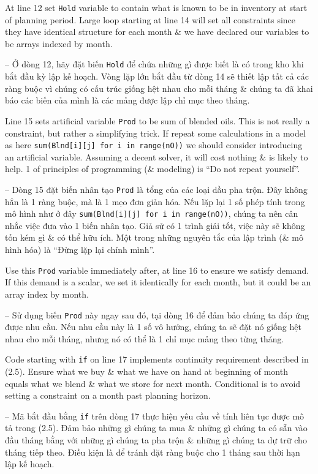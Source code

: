 \documentclass{article}
\begin{document}
\begin{itemize}
\begin{itemize}
\begin{itemize}
\begin{itemize}
                At line 12 set {\tt Hold} variable to contain what is known to be in inventory at start of planning period. Large loop starting at line 14 will set all constraints since they have identical structure for each month \& we have declared our variables to be arrays indexed by month.

                -- Ở dòng 12, hãy đặt biến {\tt Hold} để chứa những gì được biết là có trong kho khi bắt đầu kỳ lập kế hoạch. Vòng lặp lớn bắt đầu từ dòng 14 sẽ thiết lập tất cả các ràng buộc vì chúng có cấu trúc giống hệt nhau cho mỗi tháng \& chúng ta đã khai báo các biến của mình là các mảng được lập chỉ mục theo tháng.

                Line 15 sets artificial variable {\tt Prod} to be sum of blended oils. This is not really a constraint, but rather a simplifying trick. If repeat some calculations in a model as here \verb|sum(Blnd[i][j] for i in range(nO))| we should consider introducing an artificial variable. Assuming a decent solver, it will cost nothing \& is likely to help. 1 of principles of programming (\& modeling) is ``Do not repeat yourself''.

                -- Dòng 15 đặt biến nhân tạo {\tt Prod} là tổng của các loại dầu pha trộn. Đây không hẳn là 1 ràng buộc, mà là 1 mẹo đơn giản hóa. Nếu lặp lại 1 số phép tính trong mô hình như ở đây \verb|sum(Blnd[i][j] for i in range(nO))|, chúng ta nên cân nhắc việc đưa vào 1 biến nhân tạo. Giả sử có 1 trình giải tốt, việc này sẽ không tốn kém gì \& có thể hữu ích. Một trong những nguyên tắc của lập trình (\& mô hình hóa) là ``Đừng lặp lại chính mình''.

                Use this {\tt Prod} variable immediately after, at line 16 to ensure we satisfy demand. If this demand is a scalar, we set it identically for each month, but it could be an array index by month.

                -- Sử dụng biến {\tt Prod} này ngay sau đó, tại dòng 16 để đảm bảo chúng ta đáp ứng được nhu cầu. Nếu nhu cầu này là 1 số vô hướng, chúng ta sẽ đặt nó giống hệt nhau cho mỗi tháng, nhưng nó có thể là 1 chỉ mục mảng theo từng tháng.

                Code starting with {\tt if} on line 17 implements continuity requirement described in (2.5). Ensure what we buy \& what we have on hand at beginning of month equals what we blend \& what we store for next month. Conditional is to avoid setting a constraint on a month past planning horizon.

                -- Mã bắt đầu bằng {\tt if} trên dòng 17 thực hiện yêu cầu về tính liên tục được mô tả trong (2.5). Đảm bảo những gì chúng ta mua \& những gì chúng ta có sẵn vào đầu tháng bằng với những gì chúng ta pha trộn \& những gì chúng ta dự trữ cho tháng tiếp theo. Điều kiện là để tránh đặt ràng buộc cho 1 tháng sau thời hạn lập kế hoạch.


\end{itemize}
\end{itemize}
\end{itemize}
\end{itemize}
\end{document}
